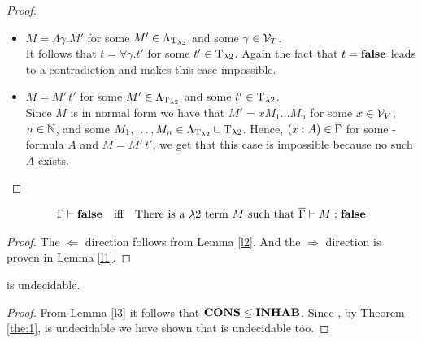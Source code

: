 \begin{proof}
\begin{itemize}
	\item[] \underline{$M=\Lambda\gamma.M'$} for some $M'\in\Lambda_{\text{T}_{\lambda2}}$ and some $\gamma\in\mathcal{V}_T$.\\ %
		It follows that $t=\forall\gamma.t'$ for some $t'\in\text{T}_{\lambda2}$. Again the fact that $t=\textbf{false}$ leads to a contradiction and makes this case impossible.
		

	\item[] \underline{$M=M'\,t'$} for some $M'\in\Lambda_{\text{T}_{\lambda2}}$ and some $t'\in\text{T}_{\lambda2}$.\\
		Since $M$ is in normal form we have that $M'=xM_1\dots M_n$ for some $x\in\mathcal{V}_V$, $n\in\mathbb{N}$, and some $M_1,\dots,M_n\in\Lambda_{\text{T}_{\lambda2}}\cup\text{T}_{\lambda2}$.
		Hence, $(x:\overline{A})\in\overline{\Gamma}$ for some \SysP-formula $A$ and $M=M'\,t'$, we get that this case is impossible because no such $A$ exists.
		
		
		
\end{itemize}
\end{proof}

\begin{lemma}\label{l3}
\begin{align*}
\Gamma\vdash\textbf{false}&&\text{iff}&&\text{There is a $\lambda2$ term $M$ such that } \overline{\Gamma}\vdash M:\textbf{false}
\end{align*}
\end{lemma}
\begin{proof}
The $\Leftarrow$ direction follows from Lemma %
\ref{l2}. And the $\Rightarrow$ direction is proven in Lemma \ref{l1}.
\end{proof}

\begin{theorem}
\lambdaInhab{} is undecidable.
\end{theorem}
\begin{proof}
From Lemma \ref{l3} it follows that $\textbf{CONS}\leq\textbf{INHAB}$. Since , by Theorem \ref{the:1}, \PCons{} is undecidable we have shown that \lambdaInhab{} is undecidable too.
\end{proof}